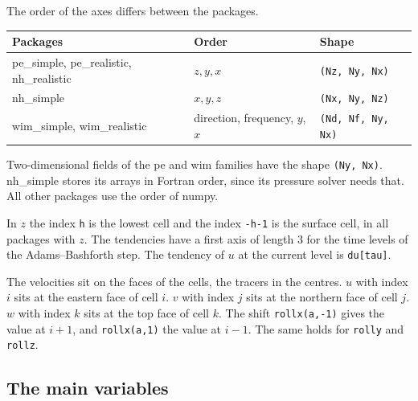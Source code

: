\documentclass[12pt]{article}
\begin{document}
The order of the axes differs between the packages.
\begin{longtable}{@{}lll@{}}
\hline
Packages & Order & Shape \\
\hline
\endhead
pe\_simple, pe\_realistic, nh\_realistic & $z, y, x$ & \verb|(Nz, Ny, Nx)| \\
nh\_simple & $x, y, z$ & \verb|(Nx, Ny, Nz)| \\
wim\_simple, wim\_realistic & direction, frequency, $y$, $x$ & \verb|(Nd, Nf, Ny, Nx)| \\
\hline
\end{longtable}
\noindent
Two-dimensional fields of the pe and wim families have the shape \verb|(Ny, Nx)|.
nh\_simple stores its arrays in Fortran order, since its pressure solver needs that.
All other packages use the order of numpy.

In $z$ the index \verb|h| is the lowest cell and the index \verb|-h-1| is the surface cell, in all packages with $z$.
The tendencies have a first axis of length 3 for the time levels of the Adams--Bashforth step.
The tendency of $u$ at the current level is \verb|du[tau]|.

The velocities sit on the faces of the cells, the tracers in the centres.
$u$ with index $i$ sits at the eastern face of cell $i$.
$v$ with index $j$ sits at the northern face of cell $j$.
$w$ with index $k$ sits at the top face of cell $k$.
The shift \verb|rollx(a,-1)| gives the value at $i+1$, and \verb|rollx(a,1)| the value at $i-1$.
The same holds for \verb|rolly| and \verb|rollz|.

\subsection*{The main variables}
\end{document}
